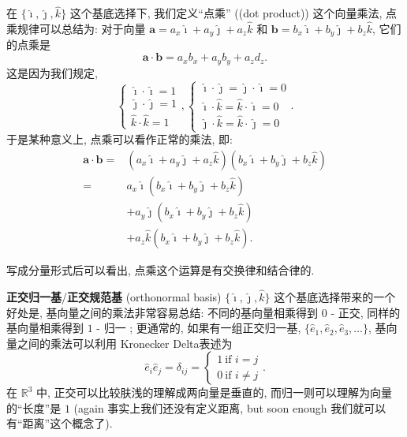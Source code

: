 在 $\{\hat{\imath},\hat{\jmath},\hat{k}\}$ 这个基底选择下, 我们定义``点乘'' ((dot product)) 这个向量乘法, 点乘规律可以总结为: 对于向量
$\boldsymbol{a}=a_x\hat{\imath}+a_y\hat{\jmath}+a_z\hat{k}$ 和
$\boldsymbol{b}=b_x\hat{\imath}+b_y\hat{\jmath}+b_z\hat{k}$,
它们的点乘是 \[
\boxed{\boldsymbol{a}\cdot\boldsymbol{b}=a_xb_x+a_yb_y+a_zd_z}.
\] 这是因为我们规定, \[
\begin{cases}
\hat{\imath}\cdot\hat{\imath}=1\\
\hat{\jmath}\cdot\hat{\jmath}=1\\
\hat{k}\cdot\hat{k}=1
\end{cases},
\begin{cases}
\hat{\imath}\cdot\hat{\jmath}=\hat{\jmath}\cdot\hat{\imath}=0\\
\hat{\imath}\cdot\hat{k}=\hat{k}\cdot\hat{\imath}=0\\
\hat{\jmath}\cdot\hat{k}=\hat{k}\cdot\hat{\jmath}=0
\end{cases}.
\] 于是某种意义上, 点乘可以看作正常的乘法, 即: 
\begin{align*}
\boldsymbol{a}\cdot\boldsymbol{b}=&(a_x\hat{\imath}+a_y\hat{\jmath}+a_z\hat{k})(b_x\hat{\imath}+b_y\hat{\jmath}+b_z\hat{k})\\
=&a_x\hat{\imath}(b_x\hat{\imath}+{b_y\hat{\jmath}+b_z\hat{k}})\\
&+a_y\hat{\jmath}({b_x\hat{\imath}}+b_y\hat{\jmath}+{b_z\hat{k}})\\
&+a_z\hat{k}({b_x\hat{\imath}+b_y\hat{\jmath}}+b_z\hat{k}).
\end{align*}

写成分量形式后可以看出, 点乘这个运算是有交换律和结合律的.

\begin{newquote}
\textbf{正交归一基}/\textbf{正交规范基} (orthonormal basis)
$\{\hat{\imath},\hat{\jmath},\hat{k}\}$ 这个基底选择带来的一个好处是,
基向量之间的乘法非常容易总结: 不同的基向量相乘得到 $0$ - 正交,
同样的基向量相乘得到 $1$ - 归一 ; 更通常的, 如果有一组正交归一基,
$\{\hat{e}_1,\hat{e}_2,\hat{e}_3,…\}$, 基向量之间的乘法可以利用
Kronecker Delta表述为 \[
\hat{e}_i\hat{e}_j=\delta_{ij}=\begin{cases}1\ \text{if }i=j\\0\ \text{if }i\neq j\end{cases}.
\] 在 $\mathbb{R}^3$ 中, 正交可以比较肤浅的理解成两向量是垂直的,
而归一则可以理解为向量的``长度''是 $1$ (again
事实上我们还没有定义距离, but soon enough
我们就可以有``距离''这个概念了).
\end{newquote}

